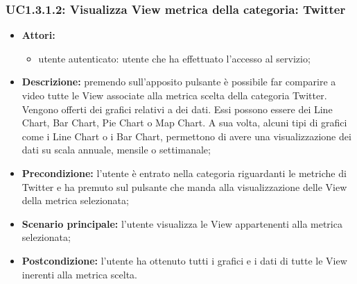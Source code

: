 \subsubsection{UC1.3.1.2: Visualizza View metrica della categoria: Twitter}
\begin{itemize}
	\item \textbf{Attori:}
	\begin{itemize}
		\item utente autenticato: utente che ha effettuato l'accesso al servizio;
	\end{itemize}
	\item \textbf{Descrizione:} premendo sull'apposito pulsante è possibile far comparire a video tutte le View associate alla metrica scelta della categoria Twitter. Vengono offerti dei grafici relativi a dei dati. Essi possono essere dei Line Chart, Bar Chart, Pie Chart o Map Chart. A sua volta, alcuni tipi di grafici come i Line Chart o i Bar Chart, permettono di avere una visualizzazione dei dati su scala annuale, mensile o settimanale;
	\item \textbf{Precondizione:} l'utente è entrato nella categoria riguardanti le metriche di Twitter e ha premuto sul pulsante che manda alla visualizzazione delle View della metrica selezionata;
	\item \textbf{Scenario principale:} l'utente visualizza le View appartenenti alla metrica selezionata;
	\item \textbf{Postcondizione:} l'utente ha ottenuto tutti i grafici e i dati di tutte le View inerenti alla metrica scelta.
\end{itemize}

